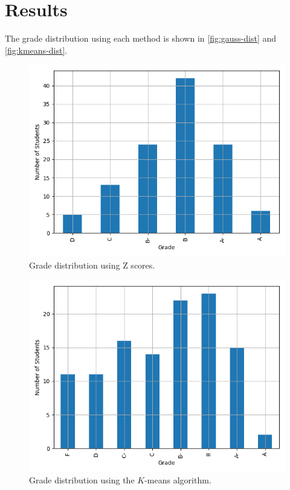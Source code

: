 \documentclass[conference]{IEEEtran}
\begin{document}
\section{Results}
\label{sec:results}
The grade distribution using each method is shown in \autoref {fig:gauss-dist}
and \autoref{fig:kmeans-dist}.
\begin{figure}[!ht]
    \centering
    \includegraphics[width=\columnwidth]{figs/grades_gauss.png}
    \caption{Grade distribution using Z scores.}
    \label{fig:gauss-dist}
\end{figure}
\begin{figure}[!ht]
    \centering
    \includegraphics[width=\columnwidth]{figs/grades_kmeans.png}
    \caption{Grade distribution using the $K$-means algorithm.}
    \label{fig:kmeans-dist}
\end{figure}
\end{document}
